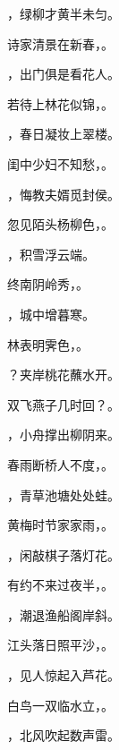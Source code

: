 \documentclass[12pt, a4paper, addpoints]{exam}
\begin{document}
\begin{questions}
\question[2] \uline{\qquad\qquad\qquad\qquad}，绿柳才黄半未匀。

\question[2] 诗家清景在新春，\uline{\qquad\qquad\qquad\qquad}。

\question[2] \uline{\qquad\qquad\qquad\qquad}，出门俱是看花人。

\question[2] 若待上林花似锦，\uline{\qquad\qquad\qquad\qquad}。

\question[2] \uline{\qquad\qquad\qquad\qquad}，春日凝妆上翠楼。

\question[2] 闺中少妇不知愁，\uline{\qquad\qquad\qquad\qquad}。

\question[2] \uline{\qquad\qquad\qquad\qquad}，悔教夫婿觅封侯。

\question[2] 忽见陌头杨柳色，\uline{\qquad\qquad\qquad\qquad}。

\question[2] \uline{\qquad\qquad\qquad\qquad}，积雪浮云端。

\question[2] 终南阴岭秀，\uline{\qquad\qquad\qquad\qquad}。

\question[2] \uline{\qquad\qquad\qquad\qquad}，城中增暮寒。

\question[2] 林表明霁色，\uline{\qquad\qquad\qquad\qquad}。

\question[2] \uline{\qquad\qquad\qquad\qquad}？夹岸桃花蘸水开。

\question[2] 双飞燕子几时回？\uline{\qquad\qquad\qquad\qquad}。

\question[2] \uline{\qquad\qquad\qquad\qquad}，小舟撑出柳阴来。

\question[2] 春雨断桥人不度，\uline{\qquad\qquad\qquad\qquad}。

\question[2] \uline{\qquad\qquad\qquad\qquad}，青草池塘处处蛙。

\question[2] 黄梅时节家家雨，\uline{\qquad\qquad\qquad\qquad}。

\question[2] \uline{\qquad\qquad\qquad\qquad}，闲敲棋子落灯花。

\question[2] 有约不来过夜半，\uline{\qquad\qquad\qquad\qquad}。

\question[2] \uline{\qquad\qquad\qquad\qquad}，潮退渔船阁岸斜。

\question[2] 江头落日照平沙，\uline{\qquad\qquad\qquad\qquad}。

\question[2] \uline{\qquad\qquad\qquad\qquad}，见人惊起入芦花。

\question[2] 白鸟一双临水立，\uline{\qquad\qquad\qquad\qquad}。

\question[2] \uline{\qquad\qquad\qquad\qquad}，北风吹起数声雷。


\end{questions}
\end{document}
